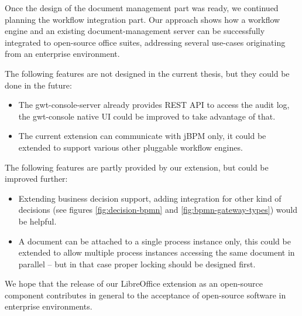 Once the design of the document management part was ready, we continued
planning the workflow integration part. Our approach shows how a workflow
engine and an existing document-management server can be successfully
integrated to open-source office suites, addressing several use-cases
originating from an enterprise environment.

The following features are not designed in the current thesis, but they could
be done in the future:

\begin{itemize}
\item The gwt-console-server already provides REST API to access the audit log,
the gwt-console native UI could be improved to take advantage of that.
\item The current extension can communicate with jBPM only, it could be
extended to support various other pluggable workflow engines.
\end{itemize}

The following features are partly provided by our extension, but could be
improved further:

\begin{itemize}
\item Extending business decision support, adding integration for other kind of
decisions (see figures \ref{fig:decision-bpmn} and
\ref{fig:bpmn-gateway-types}) would be helpful.
\item A document can be attached to a single process instance only, this could
be extended to allow multiple process instances accessing the same document in
parallel -- but in that case proper locking should be designed first.
\end{itemize}

We hope that the release of our LibreOffice extension as an open-source
component contributes in general to the acceptance of open-source software in
enterprise environments.
